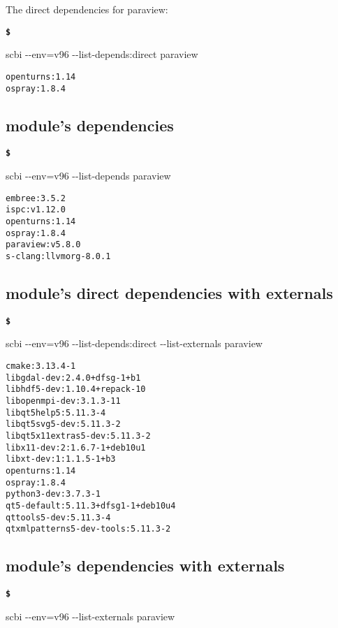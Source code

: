 \documentclass[a4paper,12pt,twoside]{article}
\newenvironment{shellcommand}{
	\begin{list}{ %
			\bfseries\texttt \$
		}{ %
			\ttfamily
			\setlength{\topsep}{-0.3ex}
			\setlength{\labelwidth}{1in}
			\setlength{\leftmargin}{0.7in}
			\setlength{\labelsep}{0.5ex}
			\setlength{\rightmargin}{0.5in}
			\setlength{\itemsep}{1ex}
			\setlength{\parsep}{0ex}
			\setlength{\listparindent}{0.5in}
		}
	}{
	\end{list}
}
\newcommand{\ddash}{-{}-}
\begin{document}
The direct dependencies for paraview:

\begin{shellcommand}
	\item scbi \ddash{}env=v96 \ddash{}list-depends:direct paraview
\end{shellcommand}

\begin{lstlisting}
openturns:1.14
ospray:1.8.4
\end{lstlisting}

\subsection{module's dependencies}

\begin{shellcommand}
	\item scbi \ddash{}env=v96 \ddash{}list-depends paraview
\end{shellcommand}

\begin{lstlisting}
embree:3.5.2
ispc:v1.12.0
openturns:1.14
ospray:1.8.4
paraview:v5.8.0
s-clang:llvmorg-8.0.1
\end{lstlisting}

\subsection{module's direct dependencies with externals}

\begin{shellcommand}
	\item scbi \ddash{}env=v96 \ddash{}list-depends:direct \ddash{}list-externals paraview
\end{shellcommand}

\begin{lstlisting}
cmake:3.13.4-1
libgdal-dev:2.4.0+dfsg-1+b1
libhdf5-dev:1.10.4+repack-10
libopenmpi-dev:3.1.3-11
libqt5help5:5.11.3-4
libqt5svg5-dev:5.11.3-2
libqt5x11extras5-dev:5.11.3-2
libx11-dev:2:1.6.7-1+deb10u1
libxt-dev:1:1.1.5-1+b3
openturns:1.14
ospray:1.8.4
python3-dev:3.7.3-1
qt5-default:5.11.3+dfsg1-1+deb10u4
qttools5-dev:5.11.3-4
qtxmlpatterns5-dev-tools:5.11.3-2
\end{lstlisting}

\subsection{module's dependencies with externals}

\begin{shellcommand}
	\item scbi \ddash{}env=v96 \ddash{}list-externals paraview
\end{shellcommand}
\end{document}
